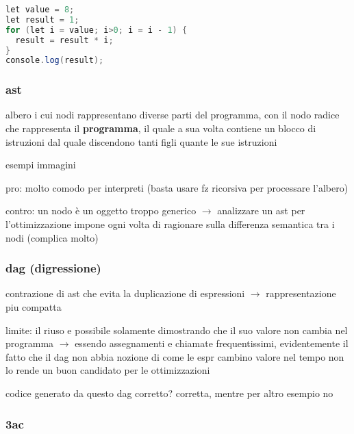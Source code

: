 \begin{lstlisting}[language=java]
let value = 8;
let result = 1;
for (let i = value; i>0; i = i - 1) {
  result = result * i;
}
console.log(result);\end{lstlisting}

\subsubsection{ast}

albero i cui nodi rappresentano diverse parti del programma, con il nodo radice che rappresenta il \textbf{programma}, il quale a sua volta contiene un blocco di istruzioni dal quale discendono tanti figli quante le sue istruzioni

esempi immagini

pro: molto comodo per interpreti (basta usare fz ricorsiva per processare l'albero)

contro: un nodo \`e un oggetto troppo generico $\rightarrow$ analizzare un ast per l'ottimizzazione impone ogni volta di ragionare sulla differenza semantica tra i nodi (complica molto)

\subsubsection{dag (digressione)}

contrazione di ast che evita la duplicazione di espressioni $\rightarrow$ rappresentazione piu compatta

limite: il riuso e possibile solamente dimostrando che il suo valore non cambia nel programma $\rightarrow$ essendo assegnamenti e chiamate frequentissimi, evidentemente il fatto che il dag non abbia nozione di come le espr cambino valore nel tempo non lo rende un buon candidato per le ottimizzazioni

\begin{example}
   codice generato da questo dag corretto?
corretta, mentre per altro esempio no   
\end{example}



\subsubsection{3ac}

